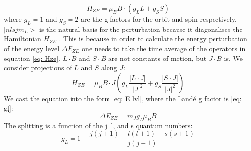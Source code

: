 \documentclass[11pt]{article}
\begin{document}
\begin{equation}
    H_{ZE} = \mu_B B \cdot (g_L L + g_S S) \label{eq: Hze}
\end{equation}
where $g_L = 1$ and $g_S = 2$ are the g-factors for the orbit and spin respectively. $|n l s j m_L >$ is the natural basis for the perturbation because it diagonalises the Hamiltonian $H_{ZE}$ \cite{foot2005atomic}. This is because in order to calculate the energy perturbation of the energy level $\Delta E_{ZE}$ one needs to take the time average of the operators in equation \eqref{eq: Hze}. $L \cdot B$ and $S \cdot B$ are not constants of motion, but $J \cdot B$ is. We consider projections of $L$ and $S$ along $J$: 
\begin{equation}
    H_{ZE} = \mu_B B \cdot J(g_L \frac{|L \cdot J|}{|J|^2} + 
    g_S \frac{|S \cdot J|}{|J|^2}) \label{eq: Hze J}
\end{equation}
We cast the equation into the form \eqref{eq: E lvl}, where the Landé g factor is \eqref{eq: gl}: 
\begin{equation}
    \Delta E_{ZE} = m_J g_L \mu_B B \label{eq: E lvl}
\end{equation}
The splitting is a function of the j, l, and s quantum numbers: 
\begin{equation}
    g_L = 1 + \frac{j(j+1)-l(l+1) +s(s+1)}{j(j+1)} \label{eq: gl}
\end{equation}
\end{document}
